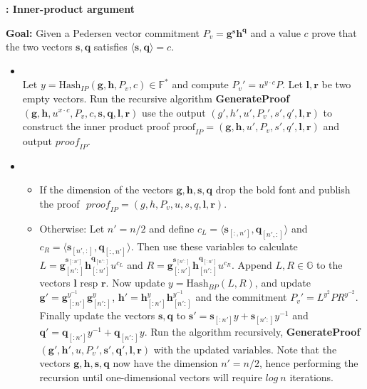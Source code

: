 \begin{algorithm}
\caption{\textbf{: Inner-product argument}}
\textbf{Goal:} Given a Pedersen vector  commitment $P_v=\bm{g}^{\bm{s}} \bm{h}^{\bm{q}}$ and a value $c$ prove that the two vectors $\bm{s},\bm{q}$ satisfies $\langle\bm{s},\bm{q}\rangle=c$.
\vspace{2pt}
\hline
\vspace{2pt}
\begin{itemize}
\item{}\\
Let $y=\text{Hash}_{IP}(\mathbf{g},\mathbf{h},P_v,c) \in\mathds{F}^*$ and compute $P_v'= u^{y\cdot c}P$. Let $\mathbf{l},\mathbf{r}$ be two empty vectors. Run the recursive algorithm \textbf{GenerateProof}$(\mathbf{g},\mathbf{h},u^{x\cdot c},P_v,c,\mathbf{s},\mathbf{q},\mathbf{l},\mathbf{r})$ use the output $(g',h',u',P_v',s',q',\mathbf{l},\mathbf{r})$ to construct the inner product proof $\text{proof}_{IP} =(\mathbf{g},\mathbf{h},u',P_v,s',q',\mathbf{l},\mathbf{r} )$ and output $\textit{proof}_{IP}$. 
\item{}
\begin{itemize}
    \item If the dimension of the vectors $\mathbf{g},\mathbf{h},\mathbf{s},\mathbf{q}$  drop the bold font and publish the proof $\textit{ proof}_{IP}=(g,h,P_v,u,s,q,\mathbf{l},\mathbf{r})$.
    \item  Otherwise:  Let $n'=n/2$ and define  $c_L=\langle \bm{s}_{[:,n']},\bm{q}_{[n',:]} \rangle$ and $c_R=\langle \mathbf{s}_{[n',:]},\mathbf{q}_{[:,n']} \rangle$. Then use these variables to calculate $L=\mathbf{g}_{[n':]}^{\mathbf{s}_{[:n']}} \mathbf{h}_{[:n']}^{\mathbf{q}_{[n':]}} u^{c_L}$ and $R=\mathbf{g}_{[:n']}^{\mathbf{s}_{[n':]}} \mathbf{h}_{[n':]}^{\mathbf{q}_{[:n']}} u^{c_R}$. Append  $L,R\in\mathds{G}$ to the vectors $\mathbf{l}$ resp $\mathbf{r}$. Now update $y=\text{Hash}_{BP}(L,R)$, and update $\mathbf{g}' = \mathbf{g}_{[:n']}^{y^{-1}}\mathbf{g}_{[n':]}^{y}$, $\mathbf{h}' = \mathbf{h}_{[:n']}^{y}\mathbf{h}_{[n':]}^{y^{-1}}$ and the commitment $P_v'=L^{y^2}PR^{y^{-2}}$. Finally update the vectors $\mathbf{s},\mathbf{q}$ to $\mathbf{s}' = \mathbf{s}_{[:n']}y+\mathbf{s}_{[n':]}y^{-1}$ and $\mathbf{q}' = \mathbf{q}_{[:n']}y^{-1}+\mathbf{q}_{[n':]}y$. Run the algorithm recursively, \textbf{GenerateProof}$(\mathbf{g}',\mathbf{h}',u,P_v',\mathbf{s}',\mathbf{q}',\mathbf{l},\mathbf{r})$ with the updated variables. Note that the vectors $\mathbf{g},\mathbf{h},\mathbf{s},\mathbf{q}$ now have the dimension $n'=n/2$, hence performing the recursion until one-dimensional vectors will require $log\:n$ iterations.

\end{itemize}
\end{itemize}
\end{algorithm}
